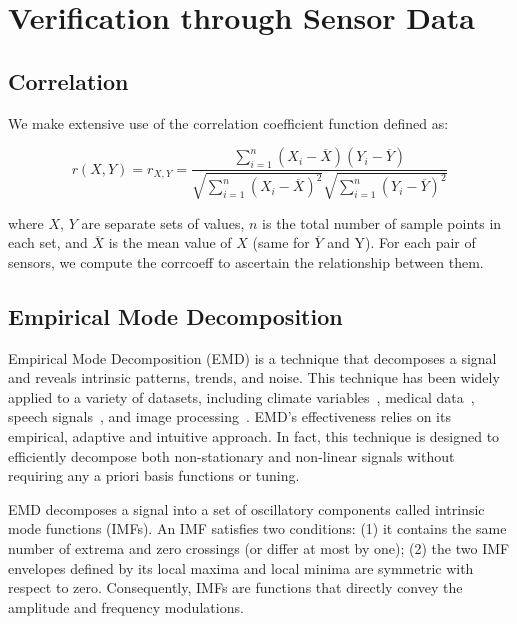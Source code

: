 \section{Verification through Sensor Data}

\subsection{Correlation}
We make extensive use of the correlation coefficient function defined as: 

\begin{displaymath}
r(X,Y) = r_{X, Y} = \frac{\sum_{i=1}^{n} (X_{i} - \overline{X})(Y_{i} - \overline{Y})}
{\sqrt{\sum_{i=1}^{n} (X_{i} - \overline{X})^2}\sqrt{\sum_{i=1}^{n} (Y_{i} - \overline{Y})^2}}
\end{displaymath}

where $X$, $Y$ are separate sets of values, $n$ is the total number of sample points in 
each set, and $\overline{X}$ is the mean value of $X$ (same for $\overline{Y}$ and Y).  %
For each pair of sensors, we compute the corrcoeff to ascertain the relationship between them.



\subsection{Empirical Mode Decomposition} \label{emd}
Empirical Mode Decomposition (EMD) \cite{huang:emd1998} is a technique that decomposes a signal and reveals intrinsic patterns, 
trends, and noise.
This technique has been widely applied to a variety of datasets, including climate variables~\cite{lee:climateEMD2011}, medical data~\cite{blanco:bioMed2008}, speech signals~\cite{huang:signalProc2006,hasan:ieeeletter2009}, and image processing~\cite{nunes:vision2005}.
EMD's effectiveness relies on its empirical, adaptive and intuitive approach.
In fact, this technique is designed to efficiently decompose both non-stationary and non-linear signals without requiring any 
a priori basis functions or tuning.  

EMD decomposes a signal into a set of oscillatory components called intrinsic mode functions (IMFs). 
An IMF satisfies two conditions: (1) it contains the same number of extrema and zero crossings (or differ at most by one); (2) the two 
IMF envelopes defined by its local maxima and local minima are symmetric with respect to zero.  Consequently, 
 IMFs are functions that directly convey the amplitude and frequency modulations.

